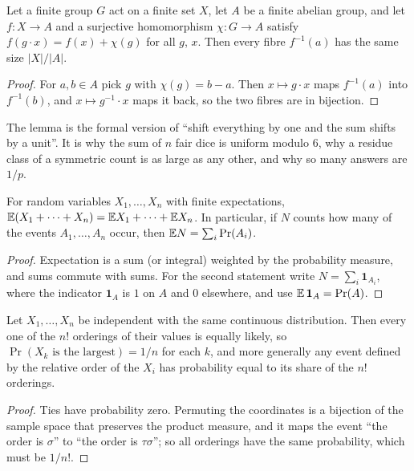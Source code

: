 \begin{lemma}
Let a finite group $G$ act on a finite set $X$, let $A$ be a finite abelian group, and let $f\colon X\to A$ and a surjective homomorphism $\chi\colon G\to A$ satisfy $f(g\cdot x)=f(x)+\chi(g)$ for all $g$, $x$. Then every fibre $f^{-1}(a)$ has the same size $|X|/|A|$.
\end{lemma}

\begin{proof}
For $a,b\in A$ pick $g$ with $\chi(g)=b-a$. Then $x\mapsto g\cdot x$ maps $f^{-1}(a)$ into $f^{-1}(b)$, and $x\mapsto g^{-1}\cdot x$ maps it back, so the two fibres are in bijection.
\end{proof}

The lemma is the formal version of ``shift everything by one and the sum shifts by a unit''. It is why the sum of $n$ fair dice is uniform modulo $6$, why a residue class of a symmetric count is as large as any other, and why so many answers are $1/p$.

\begin{theorem}
For random variables $X_1,\dots,X_n$ with finite expectations, $\mathbb{E}(X_1+\dots+X_n)=\mathbb{E} X_1+\dots+\mathbb{E} X_n$. In particular, if $N$ counts how many of the events $A_1,\dots,A_n$ occur, then $\mathbb{E} N=\sum_i \Pr(A_i)$.
\end{theorem}

\begin{proof}
Expectation is a sum (or integral) weighted by the probability measure, and sums commute with sums. For the second statement write $N=\sum_i \mathbf 1_{A_i}$, where the indicator $\mathbf 1_{A}$ is $1$ on $A$ and $0$ elsewhere, and use $\mathbb{E}\,\mathbf 1_{A}=\Pr(A)$.
\end{proof}

\begin{proposition}[Exchangeability]
Let $X_1,\dots,X_n$ be independent with the same continuous distribution. Then every one of the $n!$ orderings of their values is equally likely, so $\Pr(X_k \text{ is the largest})=1/n$ for each $k$, and more generally any event defined by the relative order of the $X_i$ has probability equal to its share of the $n!$ orderings.
\end{proposition}

\begin{proof}
Ties have probability zero. Permuting the coordinates is a bijection of the sample space that preserves the product measure, and it maps the event ``the order is $\sigma$'' to ``the order is $\tau\sigma$''; so all orderings have the same probability, which must be $1/n!$.
\end{proof}

